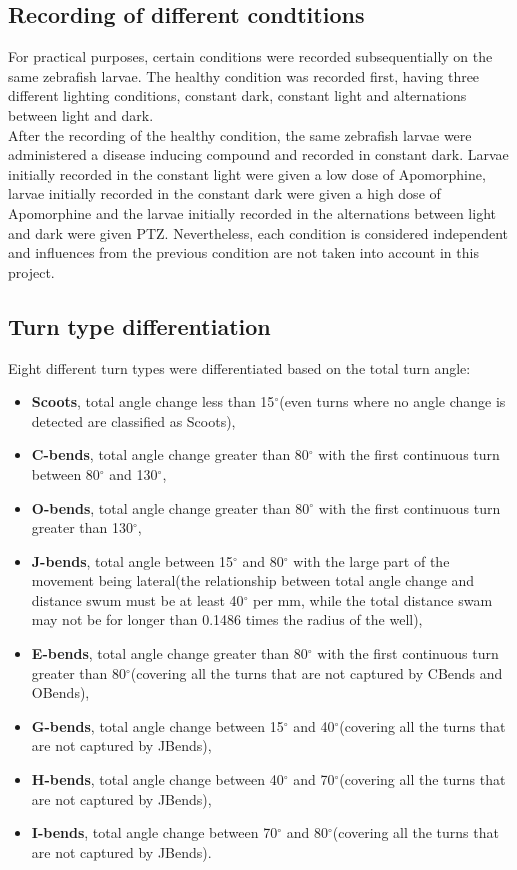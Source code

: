 \documentclass[a4paper,12pt]{article}
\begin{document}
\subsection{Recording of different condtitions}
For practical purposes, certain conditions were recorded subsequentially on the same zebrafish larvae. The healthy condition was recorded first, having three different lighting conditions, constant dark, constant light and alternations between light and dark.\\After the recording of the healthy condition, the same zebrafish larvae were administered a disease inducing compound and recorded in constant dark. Larvae initially recorded in the constant light were given a low dose of Apomorphine, larvae initially recorded in the constant dark were given a high dose of Apomorphine and the larvae initially recorded in the alternations between light and dark were given PTZ. Nevertheless, each condition is considered independent and influences from the previous condition are not taken into account in this project.

\subsection{Turn type differentiation}
Eight different turn types were differentiated based on the total turn angle:
\begin{itemize}
\item \textbf{Scoots}, total angle change less than 15$^{\circ}$(even turns where no angle change is detected are classified as Scoots),
\item \textbf{C-bends}, total angle change greater than 80$^{\circ}$ with the first continuous turn between 80$^{\circ}$ and 130$^{\circ}$,
\item \textbf{O-bends}, total angle change greater than 80$^{\circ}$ with the first continuous turn greater than 130$^{\circ}$, 
\item \textbf{J-bends}, total angle between 15$^{\circ}$ and 80$^{\circ}$ with the large part of the movement being lateral(the relationship between total angle change and distance swum must be at least 40$^{\circ}$ per mm, while the total distance swam may not be for longer than 0.1486 times the radius of the well),
\item \textbf{E-bends}, total angle change greater than 80$^{\circ}$ with the first continuous turn greater than 80$^{\circ}$(covering all the turns that are not captured by CBends and OBends),
\item \textbf{G-bends}, total angle change between 15$^{\circ}$ and 40$^{\circ}$(covering all the turns that are not captured by JBends), 
\item \textbf{H-bends}, total angle change between 40$^{\circ}$ and 70$^{\circ}$(covering all the turns that are not captured by JBends), 
\item \textbf{I-bends}, total angle change between 70$^{\circ}$ and 80$^{\circ}$(covering all the turns that are not captured by JBends).  
\end{itemize}
\end{document}
